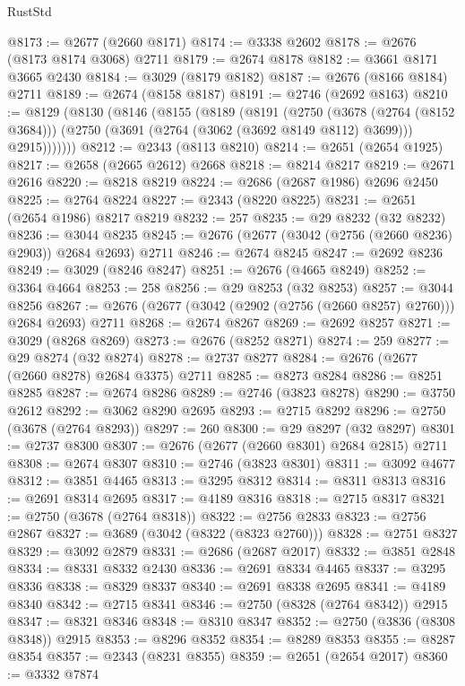\begin{lexlean}{RustStd}
\begin{coremodule}
{\begin{coremodule}
{{{{{{{{{{{{{{{{{{{{{{{{{{{{{{{{{{{{{{{{{{{{{{{{{{{{{{{@8173 := @2677 (@2660 @8171)
@8174 := @3338 @2602
@8178 := @2676 (@8173 @8174 @3068) @2711
@8179 := @2674 @8178
@8182 := @3661 @8171 @3665 @2430
@8184 := @3029 (@8179 @8182)
@8187 := @2676 (@8166 @8184) @2711
@8189 := @2674 (@8158 @8187)
@8191 := @2746 (@2692 @8163)
@8210 := @8129
    (@8130
      (@8146
        (@8155
          (@8189
            (@8191
              (@2750
                (@3678 (@2764 (@8152 @3684)))
                (@2750 (@3691 (@2764 (@3062 (@3692 @8149 @8112) @3699))) @2915)))))))
@8212 := @2343 (@8113 @8210)
@8214 := @2651 (@2654 @1925)
@8217 := @2658 (@2665 @2612) @2668
@8218 := @8214 @8217
@8219 := @2671 @2616
@8220 := @8218 @8219
@8224 := @2686 (@2687 @1986) @2696 @2450
@8225 := @2764 @8224
@8227 := @2343 (@8220 @8225)
@8231 := @2651 (@2654 @1986) @8217 @8219
@8232 := 257
@8235 := @29 @8232 (@32 @8232)
@8236 := @3044 @8235
@8245 := @2676 (@2677 (@3042 (@2756 (@2660 @8236) @2903)) @2684 @2693) @2711
@8246 := @2674 @8245
@8247 := @2692 @8236
@8249 := @3029 (@8246 @8247)
@8251 := @2676 (@4665 @8249)
@8252 := @3364 @4664
@8253 := 258
@8256 := @29 @8253 (@32 @8253)
@8257 := @3044 @8256
@8267 := @2676 (@2677 (@3042 (@2902 (@2756 (@2660 @8257) @2760))) @2684 @2693) @2711
@8268 := @2674 @8267
@8269 := @2692 @8257
@8271 := @3029 (@8268 @8269)
@8273 := @2676 (@8252 @8271)
@8274 := 259
@8277 := @29 @8274 (@32 @8274)
@8278 := @2737 @8277
@8284 := @2676 (@2677 (@2660 @8278) @2684 @3375) @2711
@8285 := @8273 @8284
@8286 := @8251 @8285
@8287 := @2674 @8286
@8289 := @2746 (@3823 @8278)
@8290 := @3750 @2612
@8292 := @3062 @8290 @2695
@8293 := @2715 @8292
@8296 := @2750 (@3678 (@2764 @8293))
@8297 := 260
@8300 := @29 @8297 (@32 @8297)
@8301 := @2737 @8300
@8307 := @2676 (@2677 (@2660 @8301) @2684 @2815) @2711
@8308 := @2674 @8307
@8310 := @2746 (@3823 @8301)
@8311 := @3092 @4677
@8312 := @3851 @4465
@8313 := @3295 @8312
@8314 := @8311 @8313
@8316 := @2691 @8314 @2695
@8317 := @4189 @8316
@8318 := @2715 @8317
@8321 := @2750 (@3678 (@2764 @8318))
@8322 := @2756 @2833
@8323 := @2756 @2867
@8327 := @3689 (@3042 (@8322 (@8323 @2760)))
@8328 := @2751 @8327
@8329 := @3092 @2879
@8331 := @2686 (@2687 @2017)
@8332 := @3851 @2848
@8334 := @8331 @8332 @2430
@8336 := @2691 @8334 @4465
@8337 := @3295 @8336
@8338 := @8329 @8337
@8340 := @2691 @8338 @2695
@8341 := @4189 @8340
@8342 := @2715 @8341
@8346 := @2750 (@8328 (@2764 @8342)) @2915
@8347 := @8321 @8346
@8348 := @8310 @8347
@8352 := @2750 (@3836 (@8308 @8348)) @2915
@8353 := @8296 @8352
@8354 := @8289 @8353
@8355 := @8287 @8354
@8357 := @2343 (@8231 @8355)
@8359 := @2651 (@2654 @2017)
@8360 := @3332 @7874
}}}}}}}}}}}}}}}}}}}}}}}}}}}}}}}}}}}}}}}}}}}}}}}}}}}}}}}
\end{coremodule}}
\end{coremodule}
\end{lexlean}
